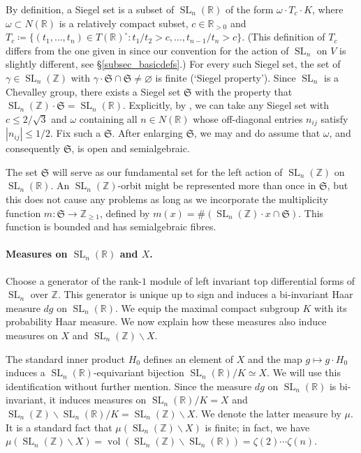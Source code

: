 \documentclass{article} %
\numberwithin{equation}{section}
\DeclareMathOperator{\SL}{SL}
\DeclareMathOperator{\Vol}{vol}
\newcommand{\R}{\mathbb{R}}
\newcommand{\Z}{\mathbb{Z}}
\newcommand{\Siegel}{\mathfrak{S}}
\begin{document}
By definition, a Siegel set is a subset of $\SL_n(\R)$ of the form $\omega \cdot T_c \cdot K$, where $\omega \subset N(\R)$ is a relatively compact subset, $c \in \R_{>0}$ and $T_c \coloneqq  \{(t_1,\dots,t_n) \in T(\R)^{\circ} \colon t_1/t_2> c, \dots,t_{n-1}/t_n > c\}$.
(This definition of $T_c$ differs from the one given in \cite[\S4.1.2]{bhargava2015mosthyperellipticarepointless} since our convention for the action of $\SL_n$ on $V$ is slightly different, see \S\ref{subsec_basicdefs}.)
For every such Siegel set, the set of $\gamma\in \SL_n(\Z)$ with $\gamma\cdot  \Siegel \cap \Siegel \neq \varnothing$ is finite \cite[Corollaire 15.3]{Borel-introductiongroupesarithmetiques} (`Siegel property'). 
Since $\SL_n$ is a Chevalley group, there exists a Siegel set $\Siegel$ with the property that $\SL_n(\Z)\cdot \Siegel = \SL_n(\R)$. Explicitly, by \cite[Chapter 4, Theorem 4.12]{PlatonovRapinchuk-Alggroupsandnumbertheory}, we can take any Siegel set with $c\leq 2/\sqrt{3}$ and $\omega$ containing all $n \in N(\R)$ whose off-diagonal entries $n_{ij}$ satisfy $|n_{ij}|\leq 1/2$.
Fix such a $\Siegel$. After enlarging $\Siegel$, we may and do assume that $\omega$, and consequently $\Siegel$, is open and semialgebraic.

The set $\Siegel$ will serve as our fundamental set for the left action of $\SL_n(\Z)$ on $\SL_n(\R)$.
An $\SL_n(\Z)$-orbit might be represented more than once in $\Siegel$, but this does not cause any problems as long as we incorporate the multiplicity function $m \colon \Siegel \rightarrow \Z_{\geq 1}$, defined by $m(x)=\#(\SL_n(\Z) \cdot x \cap \Siegel)$.
This function is bounded and has semialgebraic fibres.


\paragraph{Measures on $\SL_n(\R)$ and $X$.}

Choose a generator of the rank-$1$ module of left invariant top differential forms of $\SL_n$ over $\Z$.
This generator is unique up to sign and induces a bi-invariant Haar measure $dg$ on $\SL_n(\R)$.
We equip the maximal compact subgroup $K$ with its probability Haar measure.
We now explain how these measures also induce measures on $X$ and $\SL_n(\Z)\backslash X$.

The standard inner product $H_0$ defines an element of $X$ and the map $g\mapsto g\cdot H_0$ induces a $\SL_n(\R)$-equivariant bijection $\SL_n(\R)/K \simeq X$.
We will use this identification without further mention.
Since the measure $dg$ on $\SL_n(\R)$ is bi-invariant, it induces measures on $\SL_n(\R)/K=X$ and $\SL_n(\Z)\backslash \SL_n(\R) /K=\SL_n(\Z)\backslash X $. 
We denote the latter measure by $\mu$.
It is a standard fact that $\mu(\SL_n(\Z)\backslash X)$ is finite; in fact, we have $\mu(\SL_n(\Z)\backslash X )= \Vol(\SL_n(\Z) \backslash \SL_n(\R))= \zeta(2)\cdots\zeta(n)$.
\end{document}
